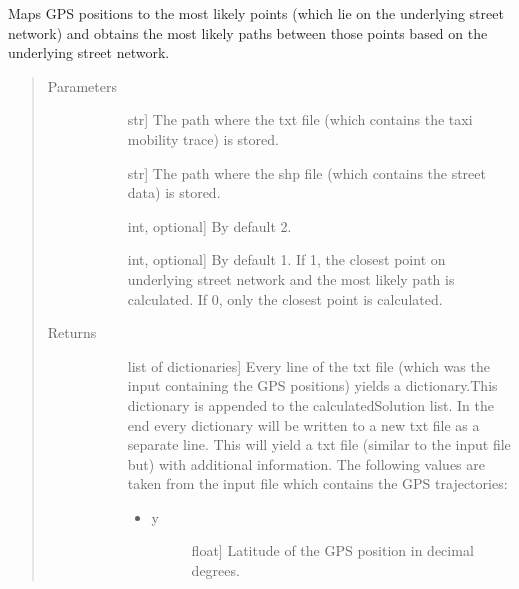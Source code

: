 \documentclass[letterpaper,10pt,english]{sphinxmanual}
\begin{document}
\begin{fulllineitems}
\label{\detokenize{index:gps2net.calculateMostLikelyPointAndPaths}}
Maps GPS positions to the most likely points (which lie on the underlying street network) and obtains the most likely paths between those points based on the underlying street network.
\begin{quote}\begin{description}
\item[{Parameters}] \leavevmode\begin{description}
\item[{}] \leavevmode{[}str{]}
The path where the txt file (which contains the taxi mobility trace) is stored.

\item[{}] \leavevmode{[}str{]}
The path where the shp file (which contains the street data) is stored.

\item[{}] \leavevmode{[}int, optional{]}
By default 2.

\item[{}] \leavevmode{[}int, optional{]}
By default 1. If 1, the closest point on underlying street network and the most likely path is calculated. If 0, only the closest point is calculated.

\end{description}

\item[{Returns}] \leavevmode\begin{description}
\item[{}] \leavevmode{[}list of dictionaries{]}
Every line of the txt file (which was the input containing the GPS positions) yields a dictionary.This dictionary is appended to the calculatedSolution list. In the end every dictionary will be written to a new txt file as a separate line. This will yield a txt file (similar to the input file but) with additional information. The following values are taken from the input file which contains the GPS trajectories:
\begin{itemize}
\item {} \begin{description}
\item[{y}] \leavevmode{[}float{]}
Latitude of the GPS position in decimal degrees.


\end{description}
\end{itemize}
\end{description}
\end{description}
\end{quote}
\end{fulllineitems}
\end{document}
